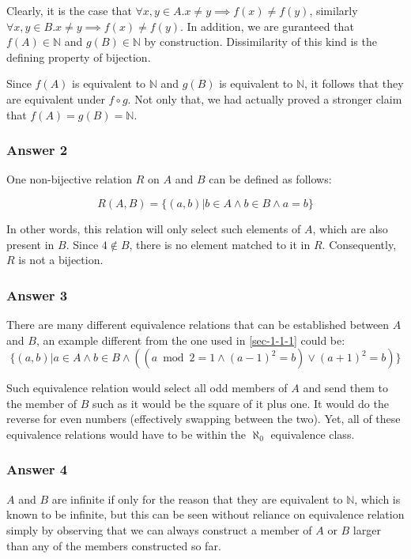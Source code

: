 \documentclass[11pt]{article}
\begin{document}
Clearly, it is the case that
$\forall x, y \in A. x \neq y \implies f(x) \neq f(y)$, similarly
$\forall x, y \in B. x \neq y \implies f(x) \neq f(y)$.  In addition,
we are guranteed that $f(A) \in \mathbb{N}$ and $g(B) \in \mathbb{N}$
by construction.  Dissimilarity of this kind is the defining property of
bijection.

Since $f(A)$ is equivalent to $\mathbb{N}$ and $g(B)$ is equivalent to
$\mathbb{N}$, it follows that they are equivalent under $f \circ g$.
Not only that, we had actually proved a stronger claim that
$f(A) = g(B) = \mathbb{N}$.
\subsubsection{Answer 2}
\label{sec-1-1-2}
One non-bijective relation $R$ on $A$ and $B$ can be defined as follows:

\begin{equation}
R(A, B) = \{(a, b) | b \in A \land b \in B \land a = b \}
\end{equation}

In other words, this relation will only select such elements of $A$, which
are also present in $B$.  Since $4 \not \in B$, there is no element matched
to it in $R$.  Consequently, $R$ is not a bijection.
\subsubsection{Answer 3}
\label{sec-1-1-3}
There are many different equivalence relations that can be established
between $A$ and $B$, an example different from the one used in \ref{sec-1-1-1}
could be:
\begin{equation}
\{(a, b) | a \in A \land b \in B \land
((a \bmod 2 = 1 \land (a - 1)^2 = b) \lor (a + 1)^2 = b)\}
\end{equation}

Such equivalence relation would select all odd members of $A$ and send them
to the member of $B$ such as it would be the square of it plus one.  It
would do the reverse for even numbers (effectively swapping between the
two).  Yet, all of these equivalence relations would have to be within the
$\aleph_0$ equivalence class.
\subsubsection{Answer 4}
\label{sec-1-1-4}
$A$ and $B$ are infinite if only for the reason that they are equivalent to
$\mathbb{N}$, which is known to be infinite, but this can be seen without
reliance on equivalence relation simply by observing that we can always
construct a member of $A$ or $B$ larger than any of the members constructed
so far.
\end{document}
